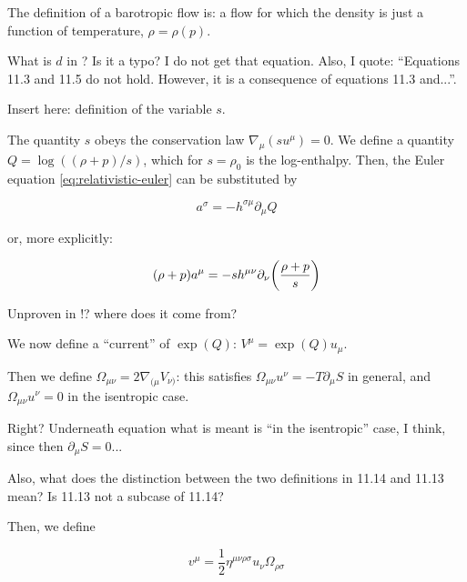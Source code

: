 \documentclass[main.tex]{subfiles}
\begin{document}
The definition of a barotropic flow is: a flow for which the density is just a function of temperature, \(\rho = \rho (p)\).

\begin{greenbox}
  What is \(d\) in \cite[equation 11.10]{Taub:1978}? Is it a typo? I do not get that equation. Also, I quote: ``Equations 11.3 and 11.5 do not hold. However, it is a consequence of equations 11.3 and...''.

  Insert here: definition of the variable \(s\).
\end{greenbox}

The quantity \(s\) obeys the conservation law \(\nabla_\mu (s u^\mu) = 0\). We define a quantity \(Q = \log ((\rho + p)/s )\), which for \(s=\rho_0\) is the log-enthalpy. Then, the Euler equation \eqref{eq:relativistic-euler} can be substituted by

\begin{equation}
  a^\sigma = - h^{\sigma \mu} \partial_\mu Q
\end{equation}

or, more explicitly:

\begin{equation}
  (\rho + p) a^\mu = -s h^{\mu\nu} \partial_\nu \qty(\frac{\rho + p}{s})
\end{equation}

\begin{greenbox}
  Unproven in \cite[]{Taub:1978}!? where does it come from?
\end{greenbox}

We now define a ``current'' of \(\exp(Q)\): \(V^\mu = \exp(Q) u_\mu \).

Then we define \(\Omega_{\mu\nu} = 2 \nabla_{(\mu} V_{\nu)}\): this satisfies \(\Omega_{\mu\nu} u^\nu = - T \partial_\mu S\) in general, and \(\Omega_{\mu\nu} u^\nu = 0\) in the isentropic case.

\begin{greenbox}
  Right? Underneath equation \cite[11.14]{Taub:1978} what is meant is ``in the isentropic'' case, I think, since then \(\partial_\mu S = 0\)...

  Also, what does the distinction between the two definitions in 11.14 and 11.13 mean? Is 11.13 not a subcase of 11.14?
\end{greenbox}

Then, we define

\begin{equation}
  v^\mu = \frac{1}{2} \eta^{\mu \nu \rho \sigma} u_\nu \Omega_{\rho \sigma}
\end{equation}
\end{document}
